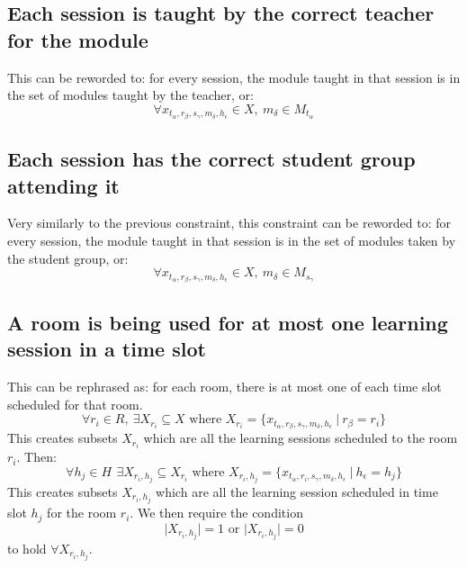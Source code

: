 \documentclass[a4paper, 12pt]{report}
\begin{document}
\subsection{Each session is taught by the correct teacher for the module}

This can be reworded to: for every session, the module taught in that session is
in the set of modules taught by the teacher, or:
\begin{equation*}
	\forall x_{t_{\alpha},r_{\beta},s_{\gamma},m_{\delta},h_{\epsilon}} \in X,
	\: m_{\delta} \in M_{t_{\alpha}}
\end{equation*}

\subsection{Each session has the correct student group attending it}

Very similarly to the previous constraint, this constraint can be reworded to: 
for every session, the module taught in that session is in the set of modules 
taken by the student group, or:
\begin{equation*}
	\forall x_{t_{\alpha},r_{\beta},s_{\gamma},m_{\delta},h_{\epsilon}} \in X,
	\: m_{\delta} \in M_{s_{\gamma}}
\end{equation*}

\subsection{A room is being used for at most one learning session in a time 
	slot}

This can be rephrased as: for each room, there is at most one of each time slot 
scheduled for that room.
\begin{equation*}
	\forall r_i \in R, \: \exists X_{r_i} \subseteq X \text{ where } X_{r_i} = 
	\{ x_{t_{\alpha},r_{\beta},s_{\gamma},m_{\delta},h_{\epsilon}} \: | \: 
	r_{\beta} = r_i\}
\end{equation*}
This creates subsets \( X_{r_i} \) which are all the learning sessions scheduled
to the room \( r_i \). Then:
\begin{equation*}
	\forall h_j \in H\, \: \exists X_{r_i,h_j} \subseteq X_{r_i} \text{ where }
	X_{r_i,h_j} = \{ x_{t_{\alpha}, r_i, s_{\gamma}, m_{\delta}, h_{\epsilon}} 
	\: | \: h_{\epsilon} = h_j \}
\end{equation*}
This creates subsets \( X_{r_i,h_j} \) which are all the learning session 
scheduled in time slot \( h_j \) for the room \( r_i \). We then require the 
condition
\begin{equation*}
	\lvert X_{r_i,h_j} \rvert = 1 \text{ or } \lvert X_{r_i,h_j} \rvert = 0
\end{equation*}
to hold \( \forall X_{r_i,h_j} \).
\end{document}
